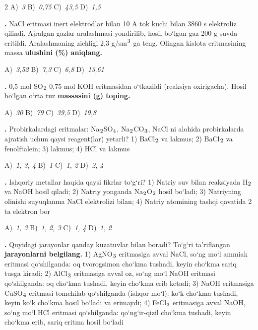 \documentclass[11pt,a4paper]{article}
\renewcommand{\textsubscript}[1]{\ensuremath{_{\text{\fontsize{8}{8}\selectfont #1}}}}
\renewcommand{\textsuperscript}[1]{\ensuremath{^{\text{\fontsize{8}{8}\selectfont #1}}}}
\newcommand{\qn}[1]{\textbf{\fontsize{11.5}{13}\selectfont #1}}
\newcommand{\qsep}{\par\vspace{13pt}}
\begin{document}
\begin{multicols}{2}
\noindent A)~\textsl{3} \hfill B)~\textsl{0,75} \hfill C)~\textsl{43,5} \hfill D)~\textsl{1,5}\par
\qsep
\noindent\qn{13.} NaCl eritmasi inert elektrodlar bilan 10 A tok kuchi bilan 3860 s elektroliz qilindi. Ajralgan gazlar aralashmasi yondirilib, hosil bo`lgan gaz 200 g suvda eritildi. Aralashmaning zichligi 2,3 g/sm\textsuperscript{3} ga teng. Olingan kislota eritmasining massa \textbf{ulushini (\%) aniqlang.}

\noindent A)~\textsl{3,52} \hfill B)~\textsl{7,3} \hfill C)~\textsl{6,8} \hfill D)~\textsl{13,61}\par
\qsep
\noindent\qn{14.} 0,5 mol SO\textsubscript{2} 0,75 mol KOH eritmasidan o`tkazildi (reaksiya oxirigacha). Hosil bo`lgan o`rta tuz \textbf{massasini (g) toping.}

\noindent A)~\textsl{30} \hfill B)~\textsl{79} \hfill C)~\textsl{39,5} \hfill D)~\textsl{19,8}\par
\qsep
\noindent\qn{15.} Probirkalardagi eritmalar: Na\textsubscript{2}SO\textsubscript{4}, Na\textsubscript{2}CO\textsubscript{3}, NaCl ni alohida probirkalarda ajratish uchun qaysi reagent(lar) yetarli? 1) BaCl\textsubscript{2} va lakmus; 2) BaCl\textsubscript{2} va fenolftalein; 3) lakmus; 4) HCl va lakmus

\noindent A)~\textsl{1, 3, 4} \hfill B)~\textsl{1} \hfill C)~\textsl{1, 2} \hfill D)~\textsl{2, 4}\par
\qsep
\noindent\qn{16.} Ishqoriy metallar haqida qaysi fikrlar to`g`ri? 1) Natriy suv bilan reaksiyada H\textsubscript{2} va NaOH hosil qiladi; 2) Natriy yonganda Na\textsubscript{2}O\textsubscript{2} hosil bo`ladi; 3) Natriyning olinishi suyuqlanma NaCl elektrolizi bilan; 4) Natriy atomining tashqi qavatida 2 ta elektron bor

\noindent A)~\textsl{1, 3} \hfill B)~\textsl{1, 2, 3} \hfill C)~\textsl{1, 4} \hfill D)~\textsl{1, 2}\par
\qsep
\noindent\qn{17.} Quyidagi jarayonlar qanday kuzatuvlar bilan boradi? To`g`ri ta'riflangan \textbf{jarayonlarni belgilang.} 1) AgNO\textsubscript{3} eritmasiga avval NaCl, so`ng mo`l ammiak eritmasi qo`shilganda: oq tvorogsimon cho`kma tushadi, keyin cho`kma sariq tusga kiradi; 2) AlCl\textsubscript{3} eritmasiga avval oz, so`ng mo`l NaOH eritmasi qo`shilganda: oq cho`kma tushadi, keyin cho`kma erib ketadi; 3) NaOH eritmasiga CuSO\textsubscript{4} eritmasi tomchilab qo`shilganda (ishqor mo`l): ko`k cho`kma tushadi, keyin ko`k cho`kma hosil bo`ladi va erimaydi; 4) FeCl\textsubscript{3} eritmasiga avval NaOH, so`ng mo`l HCl eritmasi qo`shilganda: qo`ng`ir-qizil cho`kma tushadi, keyin cho`kma erib, sariq eritma hosil bo`ladi


\end{multicols}
\end{document}
